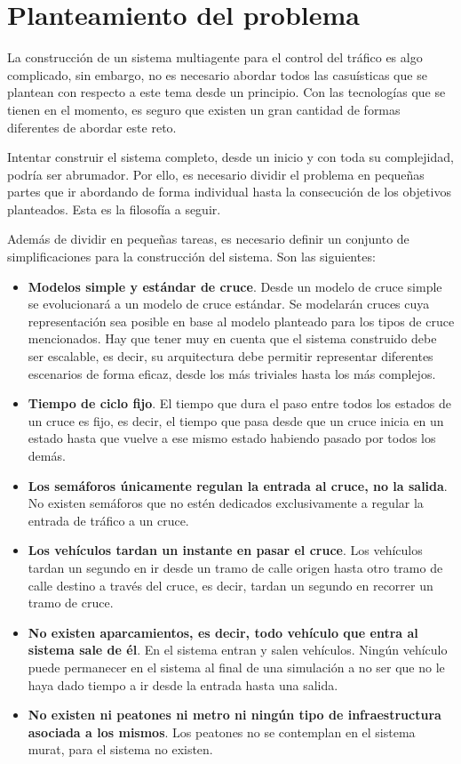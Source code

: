 \newpage
\section{Planteamiento del problema}
    \label{section:problem}
La construcción de un sistema multiagente para el control del tráfico es algo complicado, sin embargo, no es necesario abordar todos las casuísticas que se plantean con respecto a este tema desde un principio. Con las tecnologías que se tienen en el momento, es seguro que existen un gran cantidad de formas diferentes de abordar este reto.

Intentar construir el sistema completo, desde un inicio y con toda su complejidad, podría ser abrumador. Por ello, es necesario dividir el problema en pequeñas partes que ir abordando de forma individual hasta la consecución de los objetivos planteados. Esta es la filosofía a seguir.

Además de dividir en pequeñas tareas, es necesario definir un conjunto de simplificaciones para la construcción del sistema. Son las siguientes:
\begin{itemize}
    \item \textbf{Modelos simple y estándar de cruce}. Desde un modelo de cruce simple se evolucionará a un modelo de cruce estándar. Se modelarán cruces cuya representación sea posible en base al modelo planteado para los tipos de cruce mencionados. Hay que tener muy en cuenta que el sistema construido debe ser escalable, es decir, su arquitectura debe permitir representar diferentes escenarios de forma eficaz, desde los más triviales hasta los más complejos.
    \item \textbf{Tiempo de ciclo fijo}. El tiempo que dura el paso entre todos los estados de un cruce es fijo, es decir, el tiempo que pasa desde que un cruce inicia en un estado hasta que vuelve a ese mismo estado habiendo pasado por todos los demás.
    \item \textbf{Los semáforos únicamente regulan la entrada al cruce, no la salida}. No existen semáforos que no estén dedicados exclusivamente a regular la entrada de tráfico a un cruce.
    \item \textbf{Los vehículos tardan un instante en pasar el cruce}. Los vehículos tardan un segundo en ir desde un tramo de calle origen hasta otro tramo de calle destino a través del cruce, es decir, tardan un segundo en recorrer un tramo de cruce.
    \item \textbf{No existen aparcamientos, es decir, todo vehículo que entra al sistema sale de él}. En el sistema entran y salen vehículos. Ningún vehículo puede permanecer en el sistema al final de una simulación a no ser que no le haya dado tiempo a ir desde la entrada hasta una salida.
    \item \textbf{No existen ni peatones ni metro ni ningún tipo de infraestructura asociada a los mismos}. Los peatones no se contemplan en el sistema \acrshort{murat}, para el sistema no existen.
\end{itemize}

